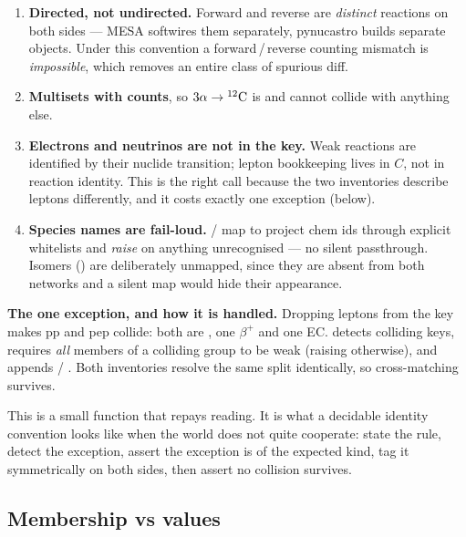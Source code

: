 \begin{enumerate}
\item \textbf{Directed, not undirected.} Forward and reverse are \emph{distinct}
      reactions on both sides --- MESA softwires them separately, pynucastro
      builds separate  objects. Under this convention a
      forward\,/\,reverse counting mismatch is \emph{impossible}, which removes
      an entire class of spurious diff.
\item \textbf{Multisets with counts}, so $3\alpha \to \nuc{C}{12}$ is
       and cannot collide with anything else.
\item \textbf{Electrons and neutrinos are not in the key.} Weak reactions are
      identified by their nuclide transition; lepton bookkeeping lives in $C$,
      not in reaction identity. This is the right call because the two
      inventories describe leptons differently, and it costs exactly one
      exception (below).
\item \textbf{Species names are fail-loud.}  / 
      map to project chem ids through explicit whitelists and \emph{raise} on
      anything unrecognised --- no silent passthrough. Isomers
      () are deliberately unmapped, since they are absent from both
      networks and a silent map would hide their appearance.
\end{enumerate}

\textbf{The one exception, and how it is handled.} Dropping leptons from the key
makes pp and pep collide: both are , one $\beta^+$ and one EC.
 detects colliding keys, requires \emph{all} members of
a colliding group to be weak (raising otherwise), and appends  /
. Both inventories resolve the same split identically, so
cross-matching survives.

\begin{aside}
This is a small function that repays reading. It is what a decidable identity
convention looks like when the world does not quite cooperate: state the rule,
detect the exception, assert the exception is of the expected kind, tag it
symmetrically on both sides, then assert no collision survives.
\end{aside}

\subsection{Membership vs values}
\label{sec:membership}

